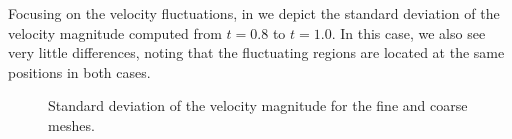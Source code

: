 Focusing on the velocity fluctuations, in  we depict the standard deviation of the velocity magnitude computed from $ t=0.8 $ to $ t=1.0 $. In this case, we also see very little differences, noting that the fluctuating regions are located at the same positions in both cases.
\begin{figure}[h!]
  \centering
  \caption{Standard deviation of the velocity magnitude for the fine and coarse meshes.}
  \label{fig-NACA_dev_velo}
\end{figure}

